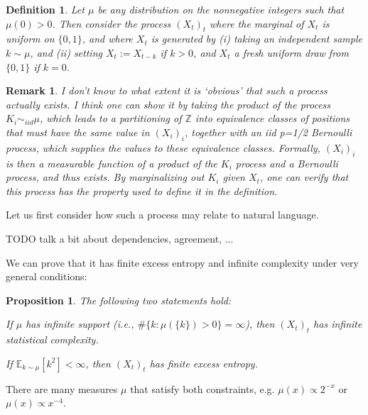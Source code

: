 \documentclass[11pt,letterpaper]{article}
\newcommand{\E}[0]{\mathbb{E}}
\newcounter{theorem}
\newtheorem{proposition}[theorem]{Proposition}
\newtheorem{defin}[theorem]{Definition}
\newtheorem{remark}[theorem]{Remark}
\begin{document}
\begin{defin}
Let $\mu$ be any distribution on the nonnegative integers such that $\mu(0) > 0$.
Then consider the process $(X_t)_t$ where the marginal of $X_t$ is uniform on $\{0,1\}$, and where $X_t$ is generated by (i) taking an independent sample $k \sim \mu$, and (ii) setting $X_t := X_{t-k}$ if $k > 0$, and $X_t$ a fresh uniform draw from $\{0,1\}$ if $k=0$.
\end{defin}

\begin{remark}
I don't know to what extent it is `obvious' that such a process actually exists. I think one can show it by taking the product of the process $K_i \sim_{iid} \mu$, which leads to a partitioning of $\mathbb{Z}$ into equivalence classes of positions that must have the same value in $(X_i)_i$, together with an iid p=1/2 Bernoulli process, which supplies the values to these equivalence classes. Formally, $(X_i)_i$ is then a measurable function of a product of the $K_i$ process and a Bernoulli process, and thus exists.
By marginalizing out $K_i$ given $X_t$, one can verify that this process has the property used to define it in the definition.
\end{remark}




Let us first consider how such a process may relate to natural language.

TODO talk a bit about dependencies, agreement, ...



We can prove that it has finite excess entropy and infinite complexity under very general conditions:


\begin{proposition}
The following two statements hold:

If $\mu$ has infinite support (i.e., $\#\{k : \mu(\{k\}) > 0\} = \infty$), then $(X_t)_t$ has infinite statistical complexity.

If $\E_{k\sim \mu}[k^2] < \infty$, then $(X_t)_t$ has finite excess entropy.
\end{proposition}
There are many measures $\mu$ that satisfy both constraints, e.g. $\mu(x) \propto 2^{-x}$ or $\mu(x) \propto x^{-4}$.
\end{document}
